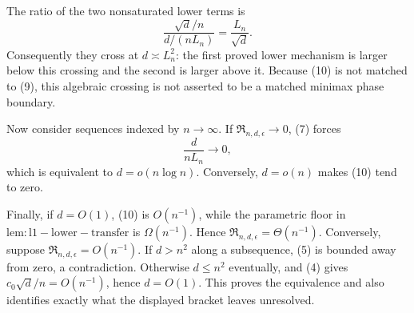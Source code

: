 The ratio of the two nonsaturated lower terms is
\[
 \frac{\sqrt d/n}{d/(nL_n)}=\frac{L_n}{\sqrt d}.
\]
Consequently they cross at \(d\asymp L_n^2\): the first proved lower mechanism is larger below this crossing and the second is larger above it.  Because (10) is not matched to (9), this algebraic crossing is not asserted to be a matched minimax phase boundary.

Now consider sequences indexed by \(n\to\infty\).  If \(\mathfrak R_{n,d,\epsilon}\to0\), (7) forces
\[
 \frac d{nL_n}\longrightarrow0,
\]
which is equivalent to \(d=o(n\log n)\).  Conversely, \(d=o(n)\) makes (10) tend to zero.

Finally, if \(d=O(1)\), (10) is \(O(n^{-1})\), while the parametric floor in \(\mathrm{lem:l1-lower-transfer}\) is \(\Omega(n^{-1})\).  Hence \(\mathfrak R_{n,d,\epsilon}=\Theta(n^{-1})\).  Conversely, suppose \(\mathfrak R_{n,d,\epsilon}=O(n^{-1})\).  If \(d>n^2\) along a subsequence, (5) is bounded away from zero, a contradiction.  Otherwise \(d\le n^2\) eventually, and (4) gives \(c_0\sqrt d/n=O(n^{-1})\), hence \(d=O(1)\).  This proves the equivalence and also identifies exactly what the displayed bracket leaves unresolved.